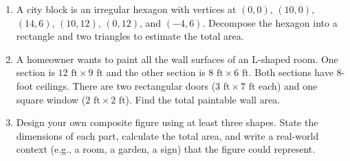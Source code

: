 \documentclass[12pt, letterpaper, fleqn]{article}
\begin{document}
\begin{enumerate}[itemsep=2cm, leftmargin=0.6cm]

\item A city block is an irregular hexagon with vertices at $(0, 0)$, $(10, 0)$, $(14, 6)$, $(10, 12)$, $(0, 12)$, and $(-4, 6)$. Decompose the hexagon into a rectangle and two triangles to estimate the total area.

\vspace{2.3cm}

\item A homeowner wants to paint all the wall surfaces of an L-shaped room. One section is $12\text{ ft} \times 9\text{ ft}$ and the other section is $8\text{ ft} \times 6\text{ ft}$. Both sections have 8-foot ceilings. There are two rectangular doors ($3\text{ ft} \times 7\text{ ft}$ each) and one square window ($2\text{ ft} \times 2\text{ ft}$). Find the total paintable wall area.

\vspace{2.3cm}

\item Design your own composite figure using at least three shapes. State the dimensions of each part, calculate the total area, and write a real-world context (e.g., a room, a garden, a sign) that the figure could represent.

\vspace{2.5cm}

\end{enumerate}
\end{document}
